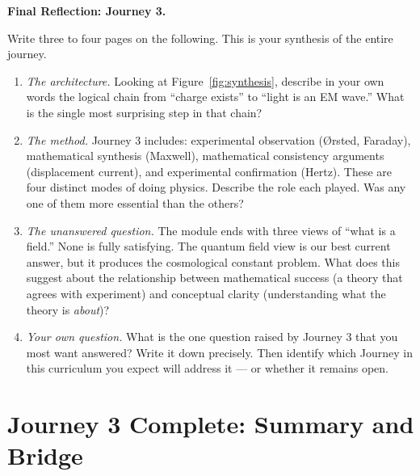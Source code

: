 \documentclass[12pt, a4paper, twoside]{book}
\newcounter{problem}[chapter]
\theoremstyle{disc}
\begin{document}
\begin{reflectionbox}
\textbf{Final Reflection: Journey 3.}

Write three to four pages on the following. This is your synthesis of the entire journey.

\begin{enumerate}[leftmargin=2em, itemsep=8pt]
  \item \textit{The architecture.} Looking at Figure~\ref{fig:synthesis}, describe in your own words the logical chain from ``charge exists'' to ``light is an EM wave.'' What is the single most surprising step in that chain?

  \item \textit{The method.} Journey 3 includes: experimental observation (\O{}rsted, Faraday), mathematical synthesis (Maxwell), mathematical consistency arguments (displacement current), and experimental confirmation (Hertz). These are four distinct modes of doing physics. Describe the role each played. Was any one of them more essential than the others?

  \item \textit{The unanswered question.} The module ends with three views of ``what is a field.'' None is fully satisfying. The quantum field view is our best current answer, but it produces the cosmological constant problem. What does this suggest about the relationship between mathematical success (a theory that agrees with experiment) and conceptual clarity (understanding what the theory is \emph{about})?

  \item \textit{Your own question.} What is the one question raised by Journey 3 that you most want answered? Write it down precisely. Then identify which Journey in this curriculum you expect will address it --- or whether it remains open.
\end{enumerate}
\end{reflectionbox}

\chapter*{Journey 3 Complete: Summary and Bridge}
\end{document}
